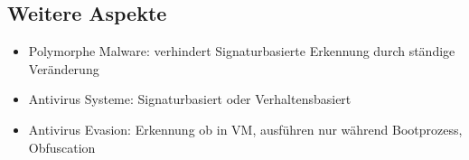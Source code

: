 \subsection{Weitere Aspekte}
\begin{itemize}
    \item Polymorphe Malware: verhindert Signaturbasierte Erkennung durch ständige Veränderung
    \item Antivirus Systeme: Signaturbasiert oder Verhaltensbasiert
    \item Antivirus Evasion: Erkennung ob in VM, ausführen nur während Bootprozess, Obfuscation
\end{itemize}
